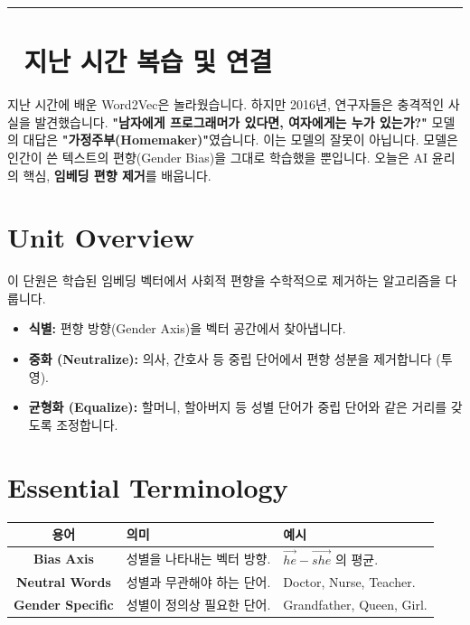 \documentclass[11pt,a4paper]{book}
\theoremstyle{definition}
\begin{document}
\vspace{0.5cm}
\hrule
\vspace{0.5cm}

\section*{🔗 지난 시간 복습 및 연결}
지난 시간에 배운 Word2Vec은 놀라웠습니다. 하지만 2016년, 연구자들은 충격적인 사실을 발견했습니다.
\textbf{"남자에게 프로그래머가 있다면, 여자에게는 누가 있는가?"}
모델의 대답은 \textbf{"가정주부(Homemaker)"}였습니다.
이는 모델의 잘못이 아닙니다. 모델은 인간이 쓴 텍스트의 편향(Gender Bias)을 그대로 학습했을 뿐입니다. 오늘은 AI 윤리의 핵심, \textbf{임베딩 편향 제거}를 배웁니다.

\section{Unit Overview}
\begin{summarybox}[title={핵심 목표}]
이 단원은 학습된 임베딩 벡터에서 사회적 편향을 수학적으로 제거하는 알고리즘을 다룹니다.
\begin{itemize}
    \item \textbf{식별:} 편향 방향(Gender Axis)을 벡터 공간에서 찾아냅니다.
    \item \textbf{중화 (Neutralize):} 의사, 간호사 등 중립 단어에서 편향 성분을 제거합니다 (투영).
    \item \textbf{균형화 (Equalize):} 할머니, 할아버지 등 성별 단어가 중립 단어와 같은 거리를 갖도록 조정합니다.
\end{itemize}
\end{summarybox}

\section{Essential Terminology}
\begin{center}
\begin{tabular}{|c|l|l|}
\hline
\textbf{용어} & \textbf{의미} & \textbf{예시} \\ \hline
\textbf{Bias Axis} & 성별을 나타내는 벡터 방향. & $\vec{he} - \vec{she}$ 의 평균. \\ \hline
\textbf{Neutral Words} & 성별과 무관해야 하는 단어. & Doctor, Nurse, Teacher. \\ \hline
\textbf{Gender Specific} & 성별이 정의상 필요한 단어. & Grandfather, Queen, Girl. \\ \hline
\end{tabular}
\end{center}
\end{document}
